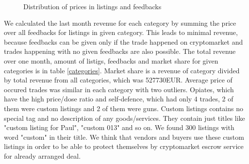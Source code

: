 \documentclass[
  digital, %
  table,   %
  lof,     %
  lot,     %
  oneside
]{fithesis3}
\begin{document}
\begin{figure}[!htb]
\label{listingxprice}
    
\caption[justification=centering]{Distribution of prices in listings and feedbacks\newline }
\end{figure}

We calculated the last month revenue for each category
by summing the price over all feedbacks for listings in given category.
This leads to minimal revenue, because feedbacks
can be given only if the trade happened on cryptomarket and 
trades happening with no given feedbacks are also possible.
The total revenue over one month, amount of listigs, feedbacks and market share for given categories 
is in table \ref{categories}.
Market share is a revenue of category divided by total revenue from all categories, which was 527730EUR.
Average price of occured trades was similar in each category
with two outliers. Opiates, which have the high price/dose ratio and 
self-defence, which had only 4 trades, 2 of them were custom listings and 2 of them were guns.
Custom listings contains no special tag and no description of any goods/services.
They contain just titles like "custom listing for Paul", "custom 013" and so on.
We found 300 listings with word "custom" in their title. 
We think that vendors and buyers use these custom listings in order to be able to protect themselves
by cryptomarket escrow service for already arranged deal.
\end{document}
